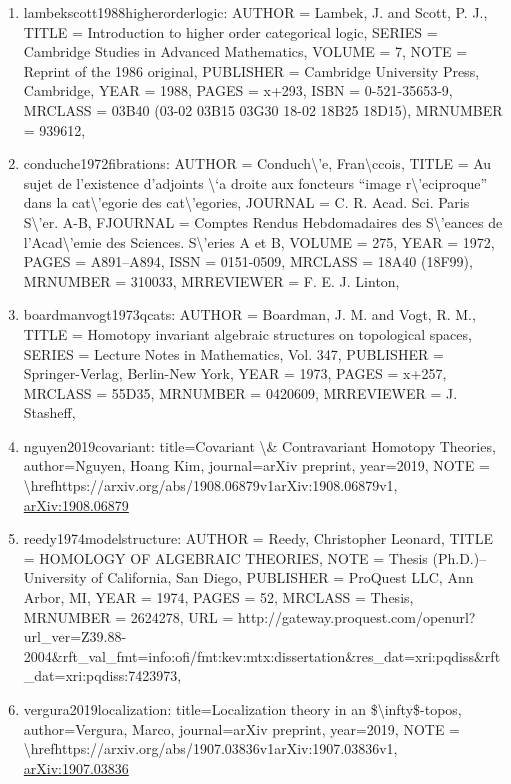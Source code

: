 \documentclass[11pt]{article}
\begin{document}
\begin{enumerate}[leftmargin=*]
  \item lambekscott1988higherorderlogic: AUTHOR = Lambek, J. and Scott, P. J., TITLE = Introduction to higher order categorical logic, SERIES = Cambridge Studies in Advanced Mathematics, VOLUME = 7, NOTE = Reprint of the 1986 original, PUBLISHER = Cambridge University Press, Cambridge, YEAR = 1988, PAGES = x+293, ISBN = 0-521-35653-9, MRCLASS = 03B40 (03-02 03B15 03G30 18-02 18B25 18D15), MRNUMBER = 939612,
  \item conduche1972fibrations: AUTHOR = Conduch\textbackslash{}'e, Fran\textbackslash{}ccois, TITLE = Au sujet de l'existence d'adjoints \textbackslash{}`a droite aux foncteurs ``image r\textbackslash{}'eciproque'' dans la cat\textbackslash{}'egorie des cat\textbackslash{}'egories, JOURNAL = C. R. Acad. Sci. Paris S\textbackslash{}'er. A-B, FJOURNAL = Comptes Rendus Hebdomadaires des S\textbackslash{}'eances de l'Acad\textbackslash{}'emie des Sciences. S\textbackslash{}'eries A et B, VOLUME = 275, YEAR = 1972, PAGES = A891--A894, ISSN = 0151-0509, MRCLASS = 18A40 (18F99), MRNUMBER = 310033, MRREVIEWER = F. E. J. Linton,
  \item boardmanvogt1973qcats: AUTHOR = Boardman, J. M. and Vogt, R. M., TITLE = Homotopy invariant algebraic structures on topological spaces, SERIES = Lecture Notes in Mathematics, Vol. 347, PUBLISHER = Springer-Verlag, Berlin-New York, YEAR = 1973, PAGES = x+257, MRCLASS = 55D35, MRNUMBER = 0420609, MRREVIEWER = J. Stasheff,
  \item nguyen2019covariant: title=Covariant \textbackslash{}\& Contravariant Homotopy Theories, author=Nguyen, Hoang Kim, journal=arXiv preprint, year=2019, NOTE = \textbackslash{}hrefhttps://arxiv.org/abs/1908.06879v1arXiv:1908.06879v1, \href{https://arxiv.org/abs/1908.06879}{arXiv:1908.06879}
  \item reedy1974modelstructure: AUTHOR = Reedy, Christopher Leonard, TITLE = HOMOLOGY OF ALGEBRAIC THEORIES, NOTE = Thesis (Ph.D.)--University of California, San Diego, PUBLISHER = ProQuest LLC, Ann Arbor, MI, YEAR = 1974, PAGES = 52, MRCLASS = Thesis, MRNUMBER = 2624278, URL = http://gateway.proquest.com/openurl?url\_ver=Z39.88-2004\&rft\_val\_fmt=info:ofi/fmt:kev:mtx:dissertation\&res\_dat=xri:pqdiss\&rft\_dat=xri:pqdiss:7423973,
  \item vergura2019localization: title=Localization theory in an \$\textbackslash{}infty\$-topos, author=Vergura, Marco, journal=arXiv preprint, year=2019, NOTE = \textbackslash{}hrefhttps://arxiv.org/abs/1907.03836v1arXiv:1907.03836v1, \href{https://arxiv.org/abs/1907.03836}{arXiv:1907.03836}

\end{enumerate}
\end{document}
